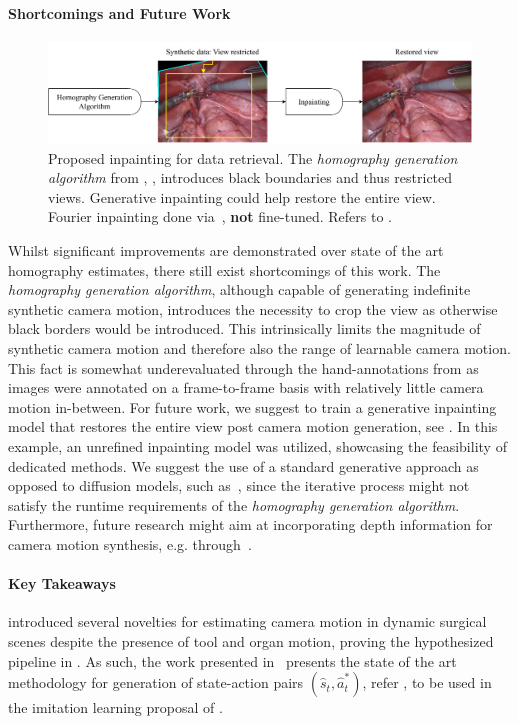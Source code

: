 \paragraph{Shortcomings and Future Work}
\begin{figure}[tb]
    \centering
    \includegraphics[width=\textwidth]{conclusion/fig/fourier_inpainting.pdf}
    \caption{Proposed inpainting for data retrieval. The \textit{homography generation algorithm} from , , introduces black boundaries and thus restricted views. Generative inpainting could help restore the entire view. Fourier inpainting done via~\cite{suvorov2021resolution}, \textbf{not} fine-tuned. Refers to .}
    \label{con:fig:inpainting}
\end{figure}
Whilst significant improvements are demonstrated over state of the art homography estimates, there still exist shortcomings of this work. The \textit{homography generation algorithm}, although capable of generating indefinite synthetic camera motion, introduces the necessity to crop the view as otherwise black borders would be introduced. This intrinsically limits the magnitude of synthetic camera motion and therefore also the range of learnable camera motion. This fact is somewhat underevaluated through the hand-annotations from  as images were annotated on a frame-to-frame basis with relatively little camera motion in-between. For future work, we suggest to train a generative inpainting model that restores the entire view post camera motion generation, see . In this example, an unrefined inpainting model was utilized, showcasing the feasibility of dedicated methods. We suggest the use of a standard generative approach as opposed to diffusion models, such as~\cite{rombach2022high}, since the iterative process might not satisfy the runtime requirements of the \textit{homography generation algorithm}. Furthermore, future research might aim at incorporating depth information for camera motion synthesis, e.g. through~\cite{budd2024transferring}.

\paragraph{Key Takeaways}  introduced several novelties for estimating camera motion in dynamic surgical scenes despite the presence of tool and organ motion, proving the hypothesized pipeline in . As such, the work presented in~\cite{huber2022deep} presents the state of the art methodology for generation of state-action pairs $(\hat{s}_t, \hat{a}^*_t)$, refer , to be used in the imitation learning proposal of .


